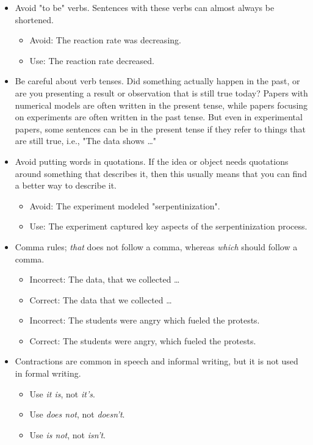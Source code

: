 \begin{itemize}
    \item Avoid "to be" verbs. Sentences with these verbs can almost always be shortened.
    \begin{itemize}
        \item Avoid: The reaction rate was decreasing.
        \item Use: The reaction rate decreased.
    \end{itemize}
    \item Be careful about verb tenses. Did something actually happen in the past, or are you presenting a result or observation that is still true today? Papers with numerical models are often written in the present tense, while papers focusing on experiments are often written in the past tense. But even in experimental papers, some sentences can be in the present tense if they refer to things that are still true, i.e., "The data shows \dots"
    \item Avoid putting words in quotations. If the idea or object needs quotations around something that describes it, then this usually means that you can find a better way to describe it.
    \begin{itemize}
        \item Avoid: The experiment modeled "serpentinization".
        \item Use: The experiment captured key aspects of the serpentinization process. 
    \end{itemize}
    \item Comma rules; \emph{that} does not follow a comma, whereas \emph{which} should follow a comma.
    \begin{itemize}
        \item Incorrect: The data, that we collected \dots
        \item Correct: The data that we collected \dots
        \item Incorrect: The students were angry which fueled the protests.
        \item Correct: The students were angry, which fueled the protests.
    \end{itemize}
    \item Contractions are common in speech and informal writing, but it is not used in formal writing.
    \begin{itemize}
        \item Use \emph{it is}, not \emph{it's}.
        \item Use \emph{does not}, not \emph{doesn't}.
        \item Use \emph{is not}, not \emph{isn't}.

\end{itemize}
\end{itemize}
